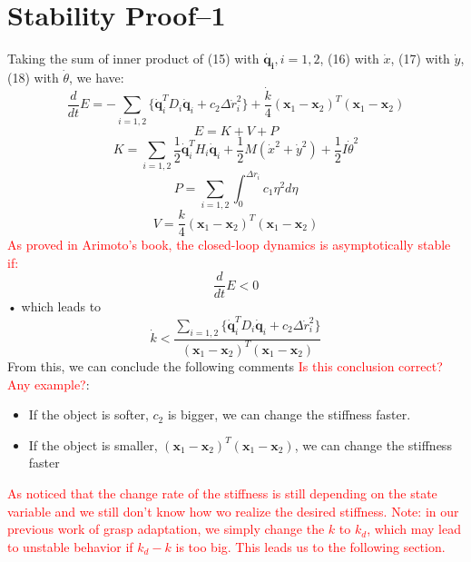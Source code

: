 \documentclass[]{article}
\begin{document}
\section{Stability Proof--1}
Taking the sum of inner product of (15) with $\mathbf{\dot{q_i}},i=1,2$, (16) with $\dot{x}$, (17) with $\dot{y}$, (18) with $\dot{\theta}$, we have:
\begin{equation}
\frac{d}{dt}E=-\sum\limits_{i=1,2}\{\mathbf{\dot{q}}_i^TD_i\mathbf{\dot{q}}_i+c_2\Delta \dot{r}_i^2\}+\frac{\dot{k}}{4}{(\mathbf{x}_1-\mathbf{x}_2)^T(\mathbf{x}_1-\mathbf{x}_2)}
\label{eqn::dE}
\end{equation}
\begin{equation}
E=K+V+P
\end{equation}
\begin{equation}
K=\sum\limits_{i=1,2}\frac{1}{2}\mathbf{\dot{q}}_i^TH_i\mathbf{\dot{q}}_i+\frac{1}{2}
M(\dot{x}^2+\dot{y}^2)+\frac{1}{2}I\dot{\theta}^2
\end{equation}
\begin{equation}
P=\sum\limits_{i=1,2}\int_{0}^{\Delta r_i}c_1\eta^2d\eta
\end{equation}
\begin{equation}
V=\frac{k}{4}(\mathbf{x}_1-\mathbf{x}_2)^T(\mathbf{x}_1-\mathbf{x}_2)
\end{equation}
\textcolor{red}{As proved in Arimoto's book, the closed-loop dynamics is asymptotically stable if:}
\begin{equation}
\frac{d}{dt}E<0
\end{equation}•
which leads to
\begin{equation}
\dot{k}<\frac{\sum\limits_{i=1,2}\{\mathbf{\dot{q}}_i^TD_i\mathbf{\dot{q}}_i+c_2\Delta \dot{r}_i^2\}}{(\mathbf{x}_1-\mathbf{x}_2)^T(\mathbf{x}_1-\mathbf{x}_2)}
\end{equation}
From this, we can conclude the following comments \textcolor{red}{Is this conclusion correct? Any example?}:
\begin{itemize}
\item If the object is softer, $c_2$ is bigger, we can change the stiffness faster.
\item If the object is smaller, $(\mathbf{x}_1-\mathbf{x}_2)^T(\mathbf{x}_1-\mathbf{x}_2)$, we can change the stiffness faster
\end{itemize}
\textcolor{red}{As noticed that the change rate of the stiffness is still depending on the state variable and we still don't know how wo realize the desired stiffness. Note: in our previous work of grasp adaptation, we simply change the $k$ to $k_d$, which may lead to unstable behavior if $k_d-k$ is too big. This leads us to the following section.}
\end{document}
